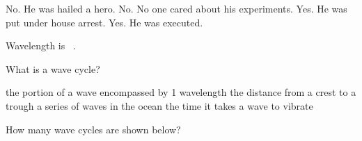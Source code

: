 \documentclass[addpoints]{exam}
\begin{document}
\begin{questions}
\begin{choices}
    \choice No. He was hailed a hero.
    \choice No. No one cared about his experiments.
    \correctchoice Yes. He was put under house arrest. 
    \choice Yes. He was executed.
\end{choices}

\question
Wavelength is \fillin\ .


\question
What is a wave cycle?

\begin{choices}
    \correctchoice the portion of a wave encompassed by 1 wavelength
    \choice the distance from a crest to a trough
    \choice a series of waves in the ocean
    \choice the time it takes a wave to vibrate
\end{choices}

\question
How many wave cycles are shown below?

\begin{figure}[h!]
    \centering
\end{figure}

\begin{oneparchoices}
\end{oneparchoices}



\end{questions}
\end{document}

